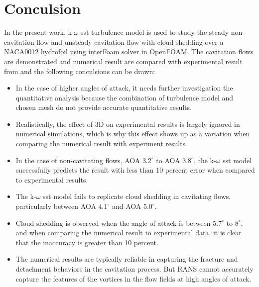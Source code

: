 \section{Conculsion}
 In the present work, k-$\omega$ sst turbulence model is used to study the steady non-cavitation flow  and 
unsteady cavitation flow with cloud shedding over a  NACA0012 hydrofoil using interFoam solver in OpenFOAM.
The cavitation flows are demonstrated and numerical result are compared with experimental result from \cite{Zhao2021}
and the following conculsions can be drawn:
\begin{itemize}
\item In the case of higher angles of attack, it needs further investigation the quantitative analysis because 
the combination of turbulence model and chosen mesh do not provide accurate quantitative results.
\item Realistically, the effect of 3D on experimental results is largely ignored in numerical simulations, 
which is why this effect shows up as a variation when comparing the numerical result with experiment results.
\item In the case of non-cavitating flows, AOA $3.2^{\circ}$ to AOA $3.8^{\circ}$, the k-$\omega$ sst model
 successfully predicts the result with less than 10 percent error when compared to experimental results. 
\item The k-$\omega$ sst model fails to replicate cloud shedding in cavitating flows, particularly between AOA $4.1^{\circ}$ and AOA $5.0^{\circ}$. 
\item Cloud shedding is observed when the angle of attack is between $5.7^{\circ}$ to $8^{\circ}$, and 
when comparing the numerical result to experimental data, it is clear that the inaccuracy is greater than 10 percent.  
\item The numerical results are typically reliable in capturing the fracture and detachment behaviors in the cavitation process. 
But RANS cannot accurately capture the features of the vortices in the flow fields at high angles of attack. 
\end{itemize}

































